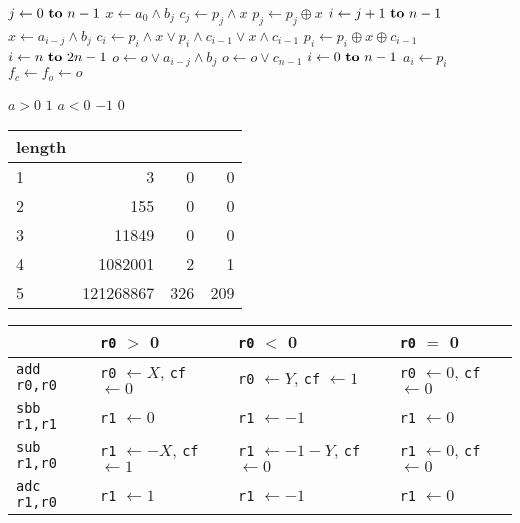 \documentclass{beamer}
\renewcommand{\gets}{\leftarrow}
\newcommand{\AND}{\land}
\newcommand{\IOR}{\lor}
\newcommand{\XOR}{\oplus}
\begin{document}
\begin{frame}
\begin{codebox}
\zi \For $j \gets 0 \To n-1$ \Do
\zi   $x \gets a_{0} \AND b_{j}$
\zi   $c_{j} \gets p_{j} \AND x$
\zi   $p_{j} \gets p_{j} \XOR x$
\zi   \For $i \gets j+1 \To n-1$ \Do
\zi     $x \gets a_{i-j} \AND b_{j}$
\zi     $c_{i} \gets p_{i} \AND x \IOR p_{i} \AND c_{i-1} \IOR x \AND c_{i-1}$
\zi     $p_{i} \gets p_{i} \XOR x \XOR c_{i-1}$ \End
\zi   \For $i \gets n \To 2n-1$ \Do
\zi     $o \gets o \IOR a_{i-j} \AND b_{j}$ \End
\zi   $o \gets o \IOR c_{n-1}$ \End
\zi \For $i \gets 0 \To n-1$ \Do
\zi   $a_{i} \gets p_{i}$ \End
\zi $f_c \gets f_o \gets o$
\end{codebox}
\end{frame}

\begin{frame}
\begin{codebox}
\zi \If $a > 0$ \Do
\zi   \Return $1$ \End
\zi \If $a < 0$ \Do
\zi   \Return $-1$ \End
\zi \Return $0$
\end{codebox}
\end{frame}

\begin{frame}
\begin{table}
\begin{tabular}{l|rrr}
length & & & \\
\hline
1 &         3 &   0 &   0 \\
2 &       155 &   0 &   0 \\
3 &     11849 &   0 &   0 \\
4 &   1082001 &   2 &   1 \\
5 & 121268867 & 326 & 209 \\
\end{tabular}
\end{table}
\end{frame}

\begin{frame}[containsverbatim]
\begin{table}
\begin{tabular}{l|lll}
& \verb|r0| $>$ 0
& \verb|r0| $<$ 0
& \verb|r0| $=$ 0 \\
\hline
\verb|add r0,r0|
& \verb|r0| $\gets X$, \verb|cf| $\gets 0$
& \verb|r0| $\gets Y$, \verb|cf| $\gets 1$
& \verb|r0| $\gets 0$, \verb|cf| $\gets 0$ \\
\verb|sbb r1,r1|
& \verb|r1| $\gets 0$
& \verb|r1| $\gets -1$
& \verb|r1| $\gets 0$ \\
\verb|sub r1,r0|
& \verb|r1| $\gets -X$, \verb|cf| $\gets 1$
& \verb|r1| $\gets -1-Y$, \verb|cf| $\gets 0$
& \verb|r1| $\gets 0$, \verb|cf| $\gets 0$ \\
\verb|adc r1,r0|
& \verb|r1| $\gets 1$
& \verb|r1| $\gets -1$
& \verb|r1| $\gets 0$ \\
\end{tabular}
\end{table}
\end{frame}
\end{document}
